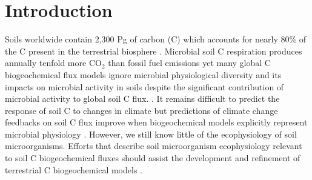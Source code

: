 \section{Introduction}
Soils worldwide contain 2,300 Pg of carbon (C) which accounts for nearly 80\%
of the C present in the terrestrial biosphere
\citep{Amundson_2001,BATJES_1996}. Microbial soil C respiration produces
annually tenfold more CO$_{2}$ than fossil fuel emissions
\citep{chapin2002principles} yet many global C biogeochemical flux models
ignore microbial physiological diversity and its impacts on microbial activity
in soils despite the significant contribution of microbial activity to global
soil C flux. \citep{Allison2010,Six2006,Treseder2011}. It remains difficult to
predict the response of soil C to changes in climate
\citep{Nett_2001,Davidson2006a,Todd-Brown2013} but predictions of climate
change feedbacks on soil C flux improve when biogeochemical models explicitly
represent microbial physiology \citep{Wieder2013}. However, we still know
little of the ecophysiology of soil microorganisms. Efforts that describe soil
microorganism ecophysiology relevant to soil C biogeochemical fluxes should
assist the development and refinement of terrestrial C biogeochemical models
\citep{Bradford2008,Neff_2001,McGuire2010}.

